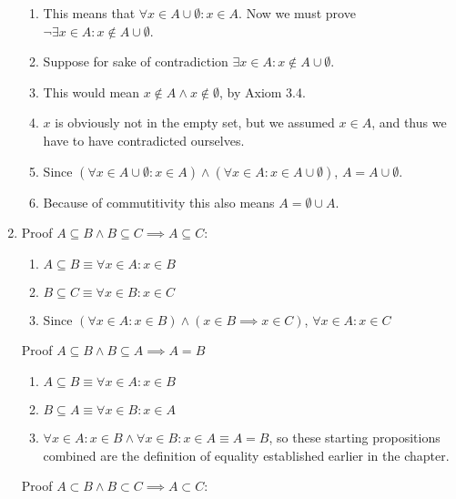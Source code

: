 \documentclass{article}
\begin{document}
\begin{enumerate}
\begin{enumerate}
                \item This means that $\forall x \in A \cup \emptyset: x \in
                    A$. Now we must prove $\neg\exists x \in A : x \notin A \cup \emptyset$.
                \item Suppose for sake of contradiction $\exists x \in A : x \notin A \cup \emptyset$.
                \item This would mean $x \notin A \land x \notin \emptyset$, by Axiom 3.4.
                \item $x$ is obviously not in the empty set, but we assumed $x \in A$,
                    and thus we have to have contradicted ourselves.
                \item Since $(\forall x \in A \cup \emptyset: x \in A) \land
                    (\forall x \in A: x \in A \cup \emptyset)$, $A = A \cup
                    \emptyset$.
                \item Because of commutitivity this also means $A = \emptyset \cup A$.
            \end{enumerate}
        \item Proof $A \subseteq B \land B \subseteq C \implies A \subseteq C$:
            \begin{enumerate}
                \item $A \subseteq B \equiv \forall x \in A : x \in B$
                \item $B \subseteq C \equiv \forall x \in B : x \in C$
                \item Since $(\forall x \in A: x \in B) \land (x \in B \implies x \in
                    C)$, $\forall x \in A: x \in C$
            \end{enumerate}
            Proof $A \subseteq B \land B \subseteq A \implies A = B$
            \begin{enumerate}
                \item $A \subseteq B \equiv \forall x \in A : x \in B$
                \item $B \subseteq A \equiv \forall x \in B : x \in A$
                \item $\forall x \in A: x \in B \land \forall x \in B: x \in A
                    \equiv A = B$, so these starting propositions combined are
                    the definition of equality established earlier in the
                    chapter.
            \end{enumerate}
            Proof $A \subset B \land B \subset C \implies A \subset C$:
            \begin{enumerate}

\end{enumerate}
\end{enumerate}
\end{document}
